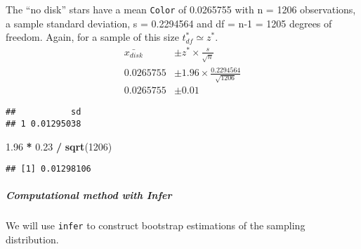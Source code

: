 \documentclass[]{article}
\newenvironment{Shaded}{\begin{snugshade}}{\end{snugshade}}
\newcommand{\CommentTok}[1]{\textcolor[rgb]{0.56,0.35,0.01}{\textit{#1}}}
\newcommand{\DecValTok}[1]{\textcolor[rgb]{0.00,0.00,0.81}{#1}}
\newcommand{\FloatTok}[1]{\textcolor[rgb]{0.00,0.00,0.81}{#1}}
\newcommand{\KeywordTok}[1]{\textcolor[rgb]{0.13,0.29,0.53}{\textbf{#1}}}
\newcommand{\NormalTok}[1]{#1}
\newcommand{\OperatorTok}[1]{\textcolor[rgb]{0.81,0.36,0.00}{\textbf{#1}}}
\newcommand{\StringTok}[1]{\textcolor[rgb]{0.31,0.60,0.02}{#1}}
\let\oldsubparagraph\subparagraph
\renewcommand{\subparagraph}[1]{\oldsubparagraph{#1}\mbox{}}
\begin{document}
\begin{Shaded}
\end{Shaded}

The ``no disk'' stars have a mean \texttt{Color} of 0.0265755 with n =
1206 observations, a sample standard deviation, s = 0.2294564 and df =
n-1 = 1205 degrees of freedom. Again, for a sample of this size
\(t_{df}^{*} \simeq z^{*}\). \[
\begin{aligned}
\bar{x_{disk}} & \pm z^{*} \times \frac{s}{\sqrt{n}} \\
0.0265755 & \pm 1.96 \times \frac{0.2294564}{\sqrt{1206}} \\
0.0265755 & \pm 0.01
\end{aligned}
\]

\begin{Shaded}
\end{Shaded}

\begin{verbatim}
##           sd
## 1 0.01295038
\end{verbatim}

\begin{Shaded}
\begin{Highlighting}[]
\FloatTok{1.96} \OperatorTok{*}\StringTok{  }\FloatTok{0.23} \OperatorTok{/}\StringTok{ }\KeywordTok{sqrt}\NormalTok{(}\DecValTok{1206}\NormalTok{)}
\end{Highlighting}
\end{Shaded}

\begin{verbatim}
## [1] 0.01298106
\end{verbatim}

\hypertarget{computational-method-with-infer-3}{%
\subparagraph{Computational method with
Infer}\label{computational-method-with-infer-3}}

We will use \texttt{infer} to construct bootstrap estimations of the
sampling distribution.
\end{document}

